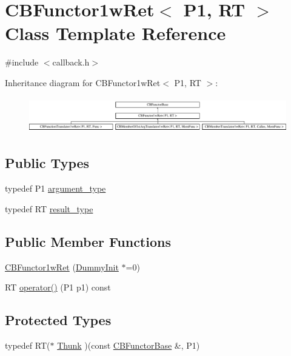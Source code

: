 \hypertarget{class_c_b_functor1w_ret}{\section{C\+B\+Functor1w\+Ret$<$ P1, R\+T $>$ Class Template Reference}
\label{class_c_b_functor1w_ret}
}


{\ttfamily \#include $<$callback.\+h$>$}

Inheritance diagram for C\+B\+Functor1w\+Ret$<$ P1, R\+T $>$\+:\begin{figure}[H]
\begin{center}
\leavevmode
\includegraphics[height=1.586402cm]{class_c_b_functor1w_ret}
\end{center}
\end{figure}
\subsection*{Public Types}
\begin{DoxyCompactItemize}
\item 
typedef P1 \hyperlink{class_c_b_functor1w_ret_a3b06b725cdb955ad2300fd32c18fabd0}{argument\+\_\+type}
\item 
typedef R\+T \hyperlink{class_c_b_functor1w_ret_aedd72816facfbae9a1dc7908b7f9eeef}{result\+\_\+type}
\end{DoxyCompactItemize}
\subsection*{Public Member Functions}
\begin{DoxyCompactItemize}
\item 
\hyperlink{class_c_b_functor1w_ret_a1570c091ec862c9f62a91bb3a7702dda}{C\+B\+Functor1w\+Ret} (\hyperlink{class_c_b_functor_base_1_1_dummy_init}{Dummy\+Init} $\ast$=0)
\item 
R\+T \hyperlink{class_c_b_functor1w_ret_afd89568c8af023ef3f509cd7e1e444a9}{operator()} (P1 p1) const 
\end{DoxyCompactItemize}
\subsection*{Protected Types}
\begin{DoxyCompactItemize}
\item 
typedef R\+T($\ast$ \hyperlink{class_c_b_functor1w_ret_a650393fbcb8839fb9e4f077d3ad281e6}{Thunk} )(const \hyperlink{class_c_b_functor_base}{C\+B\+Functor\+Base} \&, P1)
\end{DoxyCompactItemize}
